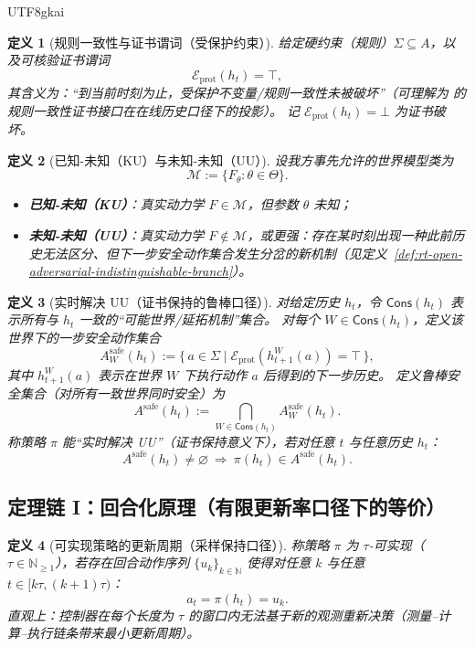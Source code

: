 \documentclass[12pt]{article}
\newtheorem{definition}{定义}[section]
\newcommand{\NN}{\mathbb{N}}
\newcommand{\GFramework}{\text{G-Framework}}
\begin{document}
\begin{CJK*}{UTF8}{gkai}
\begin{definition}[规则一致性与证书谓词（受保护约束）]
\label{def:rt-open-adversarial-certificate}
给定硬约束（规则）$\Sigma\subseteq A$，以及可核验证书谓词
\[
  \mathcal{E}_{\mathrm{prot}}(h_t)=\top,
\]
其含义为：“到当前时刻为止，受保护不变量/规则一致性未被破坏”（可理解为 \GFramework{} 的规则一致性证书接口在在线历史口径下的投影）。
记 $\mathcal{E}_{\mathrm{prot}}(h_t)=\bot$ 为证书破坏。
\end{definition}

\begin{definition}[已知-未知（KU）与未知-未知（UU）]
\label{def:rt-open-adversarial-ku-uu}
设我方事先允许的世界模型类为
\[
  \mathcal{M}:=\{F_\theta:\theta\in\Theta\}.
\]
\begin{itemize}
  \item \textbf{已知-未知（KU）}：真实动力学 $F\in\mathcal{M}$，但参数 $\theta$ 未知；
  \item \textbf{未知-未知（UU）}：真实动力学 $F\notin\mathcal{M}$，或更强：存在某时刻出现一种此前历史无法区分、但下一步安全动作集合发生分岔的新机制（见定义~\ref{def:rt-open-adversarial-indistinguishable-branch}）。
\end{itemize}
\end{definition}

\begin{definition}[实时解决 UU（证书保持的鲁棒口径）]
\label{def:rt-open-adversarial-solve-uu}
对给定历史 $h_t$，令 $\mathsf{Cons}(h_t)$ 表示所有与 $h_t$ 一致的“可能世界/延拓机制”集合。
对每个 $W\in\mathsf{Cons}(h_t)$，定义该世界下的一步安全动作集合
\[
  A^{\mathrm{safe}}_{W}(h_t)
  :=
  \{\,a\in\Sigma\mid \mathcal{E}_{\mathrm{prot}}(h_{t+1}^{W}(a))=\top\,\},
\]
其中 $h_{t+1}^{W}(a)$ 表示在世界 $W$ 下执行动作 $a$ 后得到的下一步历史。
定义鲁棒安全集合（对所有一致世界同时安全）为
\[
  A^{\mathrm{safe}}(h_t):=\bigcap_{W\in\mathsf{Cons}(h_t)}A^{\mathrm{safe}}_{W}(h_t).
\]
称策略 $\pi$ 能“实时解决 UU”（证书保持意义下），若对任意 $t$ 与任意历史 $h_t$：
\[
  A^{\mathrm{safe}}(h_t)\neq\varnothing \ \Longrightarrow\ \pi(h_t)\in A^{\mathrm{safe}}(h_t).
\]
\end{definition}

\subsection{定理链 I：回合化原理（有限更新率口径下的等价）}
\label{sec:rt-open-adversarial-turn}

\begin{definition}[可实现策略的更新周期（采样保持口径）]
\label{def:rt-open-adversarial-update-period}
称策略 $\pi$ 为 $\tau$-可实现（$\tau\in\NN_{\ge 1}$），若存在回合动作序列 $\{u_k\}_{k\in\NN}$ 使得对任意 $k$ 与任意 $t\in[k\tau,(k+1)\tau)$：
\[
  a_t=\pi(h_t)=u_k.
\]
直观上：控制器在每个长度为 $\tau$ 的窗口内无法基于新的观测重新决策（测量--计算--执行链条带来最小更新周期）。
\end{definition}


\end{CJK*}
\end{document}
